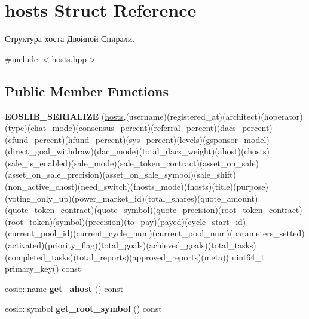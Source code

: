 \hypertarget{structhosts}{}\section{hosts Struct Reference}
\label{structhosts}


Структура хоста Двойной Спирали.  




{\ttfamily \#include $<$hosts.\+hpp$>$}

\subsection*{Public Member Functions}
\begin{DoxyCompactItemize}
\item 
\mbox{\label{structhosts_a5134c37a37ee240d75cb5f0fa36fb939}} 
{\bfseries E\+O\+S\+L\+I\+B\+\_\+\+S\+E\+R\+I\+A\+L\+I\+ZE} (\mbox{\hyperlink{structhosts}{hosts}},(username)(registered\+\_\+at)(architect)(hoperator)(type)(chat\+\_\+mode)(consensus\+\_\+percent)(referral\+\_\+percent)(dacs\+\_\+percent)(cfund\+\_\+percent)(hfund\+\_\+percent)(sys\+\_\+percent)(levels)(gsponsor\+\_\+model)(direct\+\_\+goal\+\_\+withdraw)(dac\+\_\+mode)(total\+\_\+dacs\+\_\+weight)(ahost)(chosts)(sale\+\_\+is\+\_\+enabled)(sale\+\_\+mode)(sale\+\_\+token\+\_\+contract)(asset\+\_\+on\+\_\+sale)(asset\+\_\+on\+\_\+sale\+\_\+precision)(asset\+\_\+on\+\_\+sale\+\_\+symbol)(sale\+\_\+shift)(non\+\_\+active\+\_\+chost)(need\+\_\+switch)(fhosts\+\_\+mode)(fhosts)(title)(purpose)(voting\+\_\+only\+\_\+up)(power\+\_\+market\+\_\+id)(total\+\_\+shares)(quote\+\_\+amount)(quote\+\_\+token\+\_\+contract)(quote\+\_\+symbol)(quote\+\_\+precision)(root\+\_\+token\+\_\+contract)(root\+\_\+token)(symbol)(precision)(to\+\_\+pay)(payed)(cycle\+\_\+start\+\_\+id)(current\+\_\+pool\+\_\+id)(current\+\_\+cycle\+\_\+num)(current\+\_\+pool\+\_\+num)(parameters\+\_\+setted)(activated)(priority\+\_\+flag)(total\+\_\+goals)(achieved\+\_\+goals)(total\+\_\+tasks)(completed\+\_\+tasks)(total\+\_\+reports)(approved\+\_\+reports)(meta)) uint64\+\_\+t primary\+\_\+key() const
\item 
\mbox{\label{structhosts_aaeac4196f2bcd3a2826acbaea5938e85}} 
eosio\+::name {\bfseries get\+\_\+ahost} () const
\item 
\mbox{\label{structhosts_ad8c619ace703952a8ae1cdbe1217814e}} 
eosio\+::symbol {\bfseries get\+\_\+root\+\_\+symbol} () const
\end{DoxyCompactItemize}
